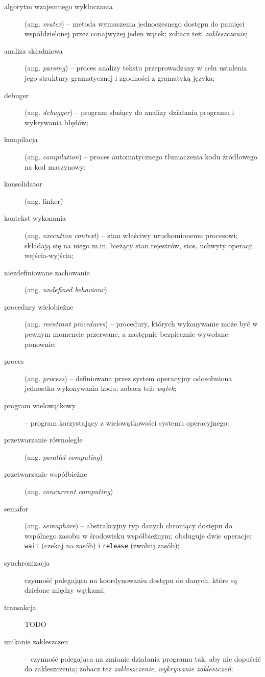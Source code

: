 \documentclass[11pt]{article}
\begin{document}
\begin{description}
    \item[algorytm wzajemnego wykluczania] (ang. \emph{mutex}) -- metoda wymuszenia jednoczesnego dostępu do pamięci współdzielonej przez conajwyżej jeden wątek; zobacz też: \emph{zakleszczenie};
    \item[analiza składniowa] (ang. \emph{parsing}) -- proces analizy tekstu przeprowadzany w celu ustalenia jego struktury gramatycznej i zgodności z gramatyką języka;
    \item[debuger] (ang. \emph{debugger}) -- program służący do analizy działania programu i wykrywania błędów;
    \item[kompilacja] (ang. \emph{compilation}) -- proces automatycznego tłumaczenia kodu źródłowego na kod maszynowy;
    \item[konsolidator] (ang. linker)
    \item[kontekst wykonania] (ang. \emph{execution context}) -- stan właściwy uruchomionemu procesowi; składają się na niego m.in. bieżący stan rejestrów, stos, uchwyty operacji wejścia-wyjścia;
    \item[niezdefiniowane zachowanie] (ang. \emph{undefined behaviour})
    \item[procedury wielobieżne] (ang. \emph{reentrant procedures}) -- procedury, których wykonywanie może być w pewnym momencie przerwane, a następnie bezpiecznie wywołane ponownie;
    \item[proces] (ang. \emph{process}) -- definiowana przez system operacyjny odosobniona jednostka wykonywania kodu; zobacz też: \emph{wątek};
    \item[program wielowątkowy] -- program korzystający z wielowątkowości systemu operacyjnego;
    \item[przetwarzanie równoległe] (ang. \emph{parallel computing})
    \item[przetwarzanie współbieżne] (ang. \emph{concurrent computing})
    \item[semafor] (ang. \emph{semaphore}) -- abstrakcyjny typ danych chroniący dostępu do wspólnego zasobu w środowisku współbieżnym; obsługuje dwie operacje: \texttt{wait} (czekaj na zasób) i \texttt{release} (zwolnij zasób);
    \item[synchronizacja] czynność polegająca na koordynowaniu dostępu do danych, które są dzielone między wątkami;
    \item[transakcja] TODO
    \item[unikanie zakleszczen] -- czynność polegająca na zmianie działania programu tak, aby nie dopuścić do zakleszczenia; zobacz też \emph{zakleszczenie}, \emph{wykrywanie zakleszczeń};

\end{description}
\end{document}
